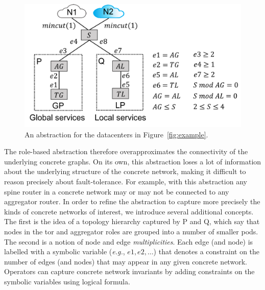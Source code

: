 \documentclass[numbers, 10pt, preprint]{sigplanconf}
\newcommand{\EG}{\emph{e.g.}}
\begin{document}
\begin{figure}[t!]
  \centering
  \includegraphics[width=\columnwidth]{figures/example3}
  \caption{An abstraction for the datacenters in Figure~\ref{fig:example}.}
  \label{fig:example3}
  \vspace{-1em}
\end{figure}

The role-based abstraction therefore overapproximates the connectivity of the underlying concrete graphs. On its own, this abstraction loses a lot of information about the underlying structure of the concrete network, making it difficult to reason precisely about fault-tolerance.
For example, with this abstraction any spine router in a concrete network may or may not be connected to any aggregator router.
%
In order to refine the abstraction to capture more precisely the kinds of concrete networks of interest,
we introduce several additional concepts. The first is the idea of a topology hierarchy captured by P and Q, which say that nodes in the tor and aggregator roles are grouped into a number of smaller pods.
The second is a notion of node and edge \emph{multiplicities}. Each edge (and node) is labelled
with a symbolic variable (\EG, $e1, e2, \ldots$) that denotes a constraint on the number of edges (and nodes) that may appear in any given concrete network. Operators can capture concrete network invariants by adding constraints on the symbolic variables using logical formula.
\end{document}
